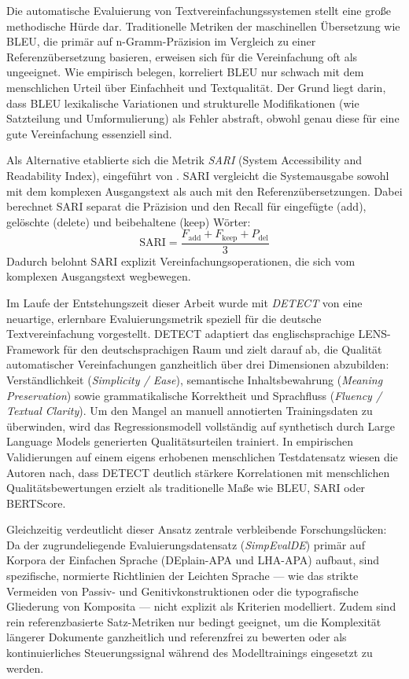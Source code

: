 Die automatische Evaluierung von Textvereinfachungssystemen stellt eine große methodische Hürde dar. Traditionelle Metriken der maschinellen Übersetzung wie BLEU, die primär auf n-Gramm-Präzision im Vergleich zu einer Referenzübersetzung basieren, erweisen sich für die Vereinfachung oft als ungeeignet. Wie \citet{alva2021unsuitability} empirisch belegen, korreliert BLEU nur schwach mit dem menschlichen Urteil über Einfachheit und Textqualität. Der Grund liegt darin, dass BLEU lexikalische Variationen und strukturelle Modifikationen (wie Satzteilung und Umformulierung) als Fehler abstraft, obwohl genau diese für eine gute Vereinfachung essenziell sind.

Als Alternative etablierte sich die Metrik \textit{SARI} (System Accessibility and Readability Index), eingeführt von \citet{xu2016optimizing}. SARI vergleicht die Systemausgabe sowohl mit dem komplexen Ausgangstext als auch mit den Referenzübersetzungen. Dabei berechnet SARI separat die Präzision und den Recall für eingefügte (add), gelöschte (delete) und beibehaltene (keep) Wörter:
\begin{equation}
    \text{SARI} = \frac{F_{\text{add}} + F_{\text{keep}} + P_{\text{del}}}{3}
\end{equation}
Dadurch belohnt SARI explizit Vereinfachungsoperationen, die sich vom komplexen Ausgangstext wegbewegen.

Im Laufe der Entstehungszeit dieser Arbeit wurde mit \textit{DETECT} von \citet{korobeynikova2024detect} eine neuartige, erlernbare Evaluierungsmetrik speziell für die deutsche Textvereinfachung vorgestellt. DETECT adaptiert das englischsprachige LENS-Framework für den deutschsprachigen Raum und zielt darauf ab, die Qualität automatischer Vereinfachungen ganzheitlich über drei Dimensionen abzubilden: Verständlichkeit (\textit{Simplicity / Ease}), semantische Inhaltsbewahrung (\textit{Meaning Preservation}) sowie grammatikalische Korrektheit und Sprachfluss (\textit{Fluency / Textual Clarity}). Um den Mangel an manuell annotierten Trainingsdaten zu überwinden, wird das Regressionsmodell vollständig auf synthetisch durch Large Language Models generierten Qualitätsurteilen trainiert. In empirischen Validierungen auf einem eigens erhobenen menschlichen Testdatensatz wiesen die Autoren nach, dass DETECT deutlich stärkere Korrelationen mit menschlichen Qualitätsbewertungen erzielt als traditionelle Maße wie BLEU, SARI oder BERTScore.

Gleichzeitig verdeutlicht dieser Ansatz zentrale verbleibende Forschungslücken: Da der zugrundeliegende Evaluierungsdatensatz (\textit{SimpEvalDE}) primär auf Korpora der Einfachen Sprache (DEplain-APA und LHA-APA) aufbaut, sind spezifische, normierte Richtlinien der Leichten Sprache — wie das strikte Vermeiden von Passiv- und Genitivkonstruktionen oder die typografische Gliederung von Komposita — nicht explizit als Kriterien modelliert. Zudem sind rein referenzbasierte Satz-Metriken nur bedingt geeignet, um die Komplexität längerer Dokumente ganzheitlich und referenzfrei zu bewerten oder als kontinuierliches Steuerungssignal während des Modelltrainings eingesetzt zu werden.

